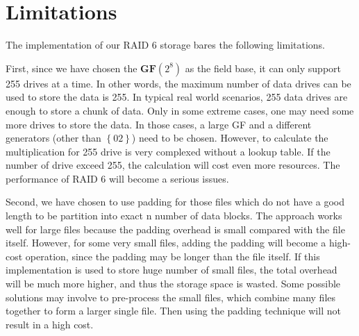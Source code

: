 \section{Limitations}

The implementation of our RAID 6 storage bares the following limitations. 

First, since we have chosen the $\mathbf{GF}(2^8)$ as the field base, it can only support 255 drives at a time. In other words, the maximum number of data drives can be used to store the data is 255. In typical real world scenarios, 255 data drives are enough to store a chunk of data. Only in some extreme cases, one may need some more drives to store the data. In those cases, a large GF and a different generators (other than $\left\{02\right\}$) need to be chosen. However, to calculate the multiplication for 255 drive is very complexed without a lookup table. If the number of drive exceed 255, the calculation will cost even more resources. The performance of RAID 6 will become a serious issues.

Second, we have chosen to use padding for those files which do not have a good length to be partition into exact n number of data blocks. The approach works well for large files because the padding overhead is small compared with the file itself. However, for some very small files, adding the padding will become a high-cost operation, since the padding may be longer than the file itself. If this implementation is used to store huge number of small files, the total overhead will be much more higher, and thus the storage space is wasted. Some possible solutions may involve to pre-process the small files, which combine many files together to form a larger single file. Then using the padding technique will not result in a high cost.
